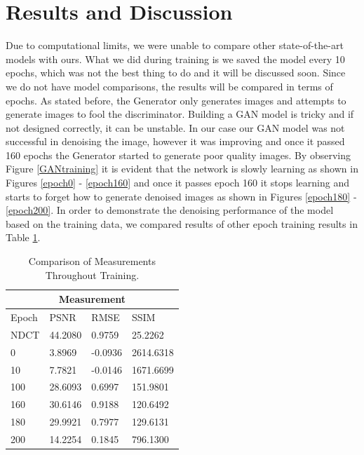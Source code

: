 \documentclass[journal]{IEEEtran}
\begin{document}
\section{Results and Discussion}
\label{results and discussion}
Due to computational limits, we were unable to compare other state-of-the-art models with ours.  What we did during training is we saved the model every 10 epochs, which was not the best thing to do and it will be discussed soon.  Since we do not have model comparisons, the results will be compared in terms of epochs.  As stated before, the Generator only generates images and attempts to generate images to fool the discriminator.  Building a GAN model is tricky and if not designed correctly, it can be unstable.  In our case our GAN model was not successful in denoising the image, however it was improving and once it passed 160 epochs the Generator started to generate poor quality images.  By observing Figure \ref{GANtraining} it is evident that the network is slowly learning as shown in Figures \ref{epoch0} - \ref{epoch160} and once it passes epoch 160 it stops learning and starts to forget how to generate denoised images as shown in Figures \ref{epoch180} - \ref{epoch200}.  In order to demonstrate the denoising performance of the model based on the training data, we compared results of other epoch training  results in Table \ref{comparison}.  

\begin{table}[h!]
\centering
\caption{Comparison of Measurements Throughout Training.}
\label{comparison}
	\begin{tabular}{ |p{1.5cm}|p{1.5cm}|p{1.5cm}|p{1.5cm}|  }
	\hline
	\multicolumn{4}{|c|}{\textbf{Measurement}} \\
	\hline
	Epoch & PSNR & RMSE & SSIM \\
	\hline
	NDCT & 44.2080 & 0.9759 & 25.2262\\
	0 & 3.8969 & -0.0936 & 2614.6318\\
	10 & 7.7821 & -0.0146 & 1671.6699\\
	100 & 28.6093 & 0.6997 & 151.9801\\
	160 & 30.6146 & 0.9188 & 120.6492 \\
	180 & 29.9921 & 0.7977 & 129.6131\\
	200 & 14.2254 & 0.1845 & 796.1300\\
	\hline
	\end{tabular}
\end{table}
\end{document}
